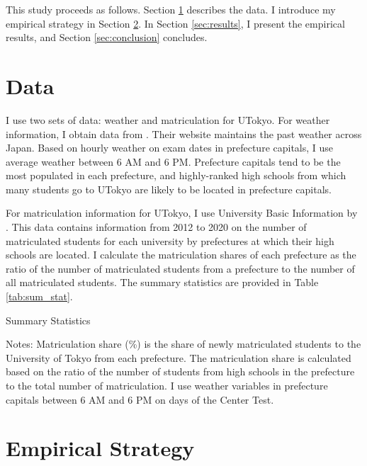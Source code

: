 \documentclass[12pt,letterpaper]{article}
\begin{document}
This study proceeds as follows.
Section \ref{sec:data} describes the data. 
I introduce my empirical strategy in Section \ref{sec:empirical_strategy}.
In Section \ref{sec:results}, I present the empirical results, and Section \ref{sec:conclusion} concludes.
  
\section{Data}\label{sec:data}

I use two sets of data: weather and matriculation for UTokyo.
For weather information, I obtain data from .
Their website maintains the past weather across Japan.
Based on hourly weather on exam dates in prefecture capitals, I use average weather between 6 AM and 6 PM.
Prefecture capitals tend to be the most populated in each prefecture, and highly-ranked high schools from which many students go to UTokyo are likely to be located in prefecture capitals.

For matriculation information for UTokyo, I use University Basic Information by .
This data contains information from 2012 to 2020 on the number of matriculated students for each university by prefectures at which their high schools are located.
I calculate the matriculation shares of each prefecture as the ratio of the number of matriculated students from a prefecture to the number of all matriculated students.
The summary statistics are provided in Table \ref{tab:sum_stat}.

\begin{table}[!htbp]
  \centering
  \caption{Summary Statistics}
  \resizebox{0.8\linewidth}{!}{
  
  }
  \label{tab:sum_stat}
  \footnotesize
  \begin{tablenotes}
    \item 
      Notes:
      Matriculation share (\%) is the share of newly matriculated students to the University of Tokyo from each prefecture.
      The matriculation share is calculated based on the ratio of the number of students from high schools in the prefecture to the total number of matriculation.
      I use weather variables in prefecture capitals between 6 AM and 6 PM on days of the Center Test.
  \end{tablenotes}
\end{table}

\section{Empirical Strategy}\label{sec:empirical_strategy}
\end{document}

